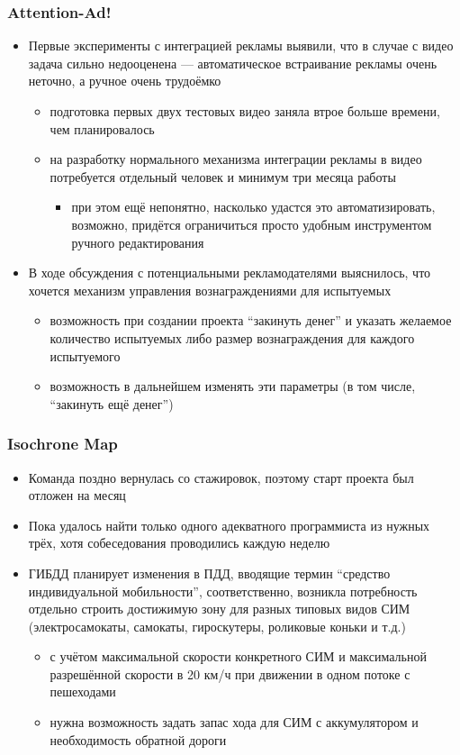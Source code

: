\documentclass[xetex,mathserif,serif]{beamer}
\begin{document}
	\begin{frame}
		\frametitle{Attention-Ad!}
		\begin{itemize}
			\item Первые эксперименты с интеграцией рекламы выявили, что в случае с видео задача сильно недооценена --- автоматическое встраивание рекламы очень неточно, а ручное очень трудоёмко
			\begin{itemize}
				\item подготовка первых двух тестовых видео заняла втрое больше времени, чем планировалось
				\item на разработку нормального механизма интеграции рекламы в видео потребуется отдельный человек и минимум три месяца работы
				\begin{itemize}
					\item при этом ещё непонятно, насколько удастся это автоматизировать, возможно, придётся ограничиться просто удобным инструментом ручного редактирования
				\end{itemize}
			\end{itemize}
			\item В ходе обсуждения с потенциальными рекламодателями выяснилось, что хочется механизм управления вознаграждениями для испытуемых
			\begin{itemize}
				\item возможность при создании проекта ``закинуть денег'' и указать желаемое количество испытуемых либо размер вознаграждения для каждого испытуемого
				\item возможность в дальнейшем изменять эти параметры (в том числе, ``закинуть ещё денег'')
			\end{itemize}
		\end{itemize}
	\end{frame}

	\begin{frame}
		\frametitle{Isochrone Map}
		\begin{itemize}
			\item Команда поздно вернулась со стажировок, поэтому старт проекта был отложен на месяц
			\item Пока удалось найти только одного адекватного программиста из нужных трёх, хотя собеседования проводились каждую неделю
			\item ГИБДД планирует изменения в ПДД, вводящие термин ``средство индивидуальной мобильности'', соответственно, возникла потребность отдельно строить достижимую зону для разных типовых видов СИМ (электросамокаты, самокаты, гироскутеры, роликовые коньки и т.д.)
			\begin{itemize}
				\item с учётом максимальной скорости конкретного СИМ и максимальной разрешённой скорости в 20 км/ч при движении в одном потоке с пешеходами
				\item нужна возможность задать запас хода для СИМ с аккумулятором и необходимость обратной дороги
			\end{itemize}
		\end{itemize}
	\end{frame}
\end{document}
